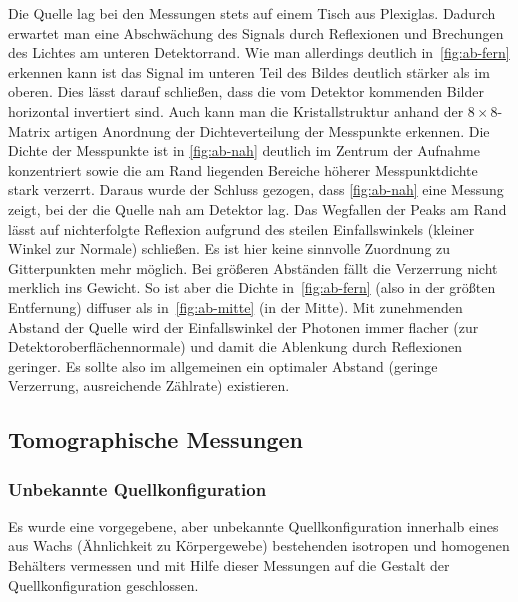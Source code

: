 \documentclass[slug=PET, room=Andreas-Schubert-Bau\,\ 424A,
supervisor=Carsten\ Bittrich, coursedate=10.\ 01.\ 2020, ngerman]{../../Lab_Report_LaTeX/lab_report}
\begin{document}
Die Quelle lag bei den Messungen stets auf einem Tisch aus
Plexiglas. Dadurch erwartet man eine Abschwächung des Signals durch
Reflexionen und Brechungen des Lichtes am unteren Detektorrand.  Wie
man allerdings deutlich in~\ref{fig:ab-fern} erkennen kann ist das
Signal im unteren Teil des Bildes deutlich stärker als im oberen. Dies
lässt darauf schließen, dass die vom Detektor kommenden Bilder
horizontal invertiert sind.  Auch kann man die Kristallstruktur anhand
der \(8\times 8\)-Matrix artigen Anordnung der Dichteverteilung der
Messpunkte erkennen.  Die Dichte der Messpunkte ist in
\ref{fig:ab-nah} deutlich im Zentrum der Aufnahme konzentriert sowie
die am Rand liegenden Bereiche höherer Messpunktdichte stark
verzerrt. Daraus wurde der Schluss gezogen, dass \ref{fig:ab-nah} eine Messung
zeigt, bei der die Quelle nah am Detektor lag. Das Wegfallen der Peaks
am Rand l\"asst auf nichterfolgte Reflexion aufgrund des steilen
Einfallswinkels (kleiner Winkel zur Normale) schließen. Es ist hier
keine sinnvolle Zuordnung zu Gitterpunkten mehr m\"oglich.  Bei
gr\"o\ss{}eren Abst\"anden f\"allt die Verzerrung nicht merklich ins
Gewicht. So ist aber die Dichte in~\ref{fig:ab-fern} (also in der
gr\"o\ss{}ten Entfernung) diffuser als in~\ref{fig:ab-mitte} (in der
Mitte). Mit zunehmenden Abstand der Quelle wird der Einfallswinkel der
Photonen immer flacher (zur Detektoroberfl\"achennormale) und damit
die Ablenkung durch Reflexionen geringer. Es sollte also im
allgemeinen ein optimaler Abstand (geringe Verzerrung, ausreichende
Z\"ahlrate) existieren.


\subsection{Tomographische Messungen}
\label{sec:tom}

\subsubsection{Unbekannte Quellkonfiguration}
\label{sec:tom1}

Es wurde eine vorgegebene, aber unbekannte Quellkonfiguration
innerhalb eines aus Wachs (\"Ahnlichkeit zu K\"orpergewebe)
bestehenden isotropen und homogenen Beh\"alters vermessen und mit Hilfe
dieser Messungen auf die Gestalt der Quellkonfiguration geschlossen.
\end{document}
